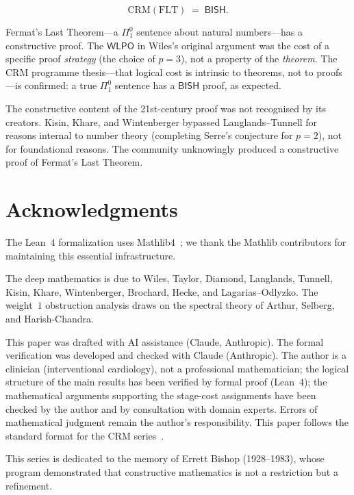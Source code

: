 \documentclass[11pt]{article}
\theoremstyle{plain}
\theoremstyle{definition}
\theoremstyle{remark}
\newcommand{\CRM}{\mathrm{CRM}}
\newcommand{\BISH}{\mathsf{BISH}}
\newcommand{\WLPO}{\mathsf{WLPO}}
\begin{document}
\[
  \boxed{\CRM(\mathrm{FLT}) \;=\; \BISH.}
\]

Fermat's Last Theorem---a $\Pi^0_1$ sentence about natural
numbers---has a constructive proof.  The $\WLPO$ in
Wiles's original argument was the cost of a specific proof
\emph{strategy} (the choice of $p = 3$), not a property of
the \emph{theorem}.  The CRM programme thesis---that logical
cost is intrinsic to theorems, not to proofs---is confirmed:
a true $\Pi^0_1$ sentence has a $\BISH$ proof, as expected.

The constructive content of the 21st-century proof was not
recognised by its creators.  Kisin, Khare, and Wintenberger
bypassed Langlands--Tunnell for reasons internal to number
theory (completing Serre's conjecture for $p = 2$), not for
foundational reasons.  The community unknowingly produced a
constructive proof of Fermat's Last Theorem.


\section*{Acknowledgments}

The Lean~4 formalization uses Mathlib4~\cite{mathlib}; we thank the
Mathlib contributors for maintaining this essential infrastructure.

The deep mathematics is due to Wiles, Taylor, Diamond,
Langlands, Tunnell, Kisin, Khare, Wintenberger, Brochard,
Hecke, and Lagarias--Odlyzko.  The weight~$1$ obstruction
analysis draws on the spectral theory of Arthur, Selberg,
and Harish-Chandra.

This paper was drafted with AI assistance (Claude, Anthropic).
The formal verification was developed and checked with Claude
(Anthropic).  The author is a clinician (interventional
cardiology), not a professional mathematician; the logical structure
of the main results has been verified by formal proof (Lean~4); the
mathematical arguments supporting the stage-cost assignments have been
checked by the author and by consultation with domain experts.
Errors of mathematical judgment remain the author's responsibility.
This paper follows the standard format for the CRM
series~\cite{format-guide}.

This series is dedicated to the memory of Errett Bishop (1928--1983),
whose program demonstrated that constructive mathematics is not a
restriction but a refinement.
\end{document}
